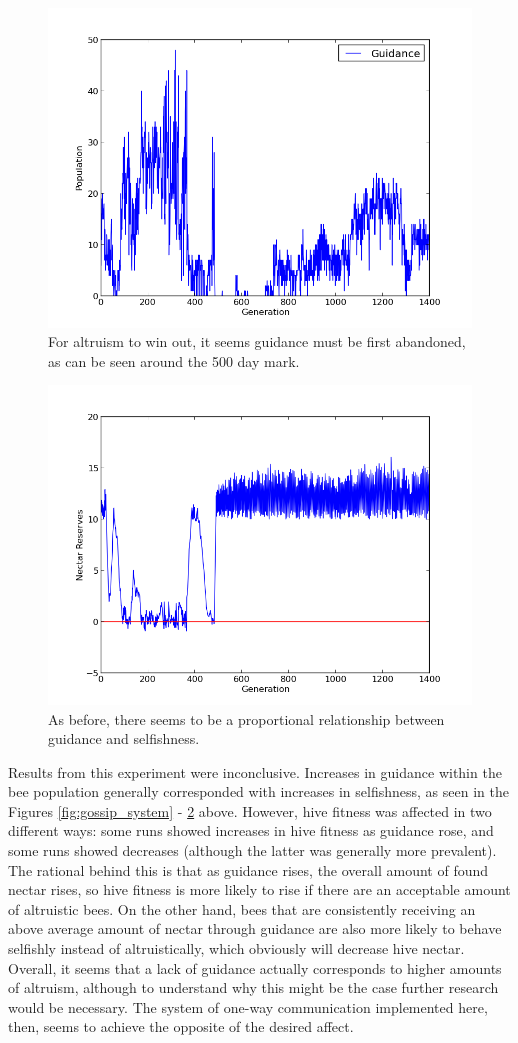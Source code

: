 \documentclass[twoside]{article}
\begin{document}
\begin{multicols}{2}
                        \begin{figure}[H]
				\begin{center}
					\includegraphics[width=.5\textwidth]{results/gossip_alt_tell.png}
				\end{center}
                \caption{For altruism to win out, it seems guidance must be first abandoned, as can be seen around the 500 day mark.}
				\label{fig:altruistic_guidance}
			\end{figure}

			\begin{figure}[H]
				\begin{center}
					\includegraphics[width=.5\textwidth]{results/gossip_alt_res.png}
				\end{center}
                \caption{As before, there seems to be a proportional relationship between guidance and selfishness.}
				\label{fig:altruistic_reserves}
			\end{figure}


            Results from this experiment were inconclusive. Increases in guidance within the bee population generally corresponded with increases in selfishness, as seen in the Figures \ref{fig:gossip_system} - \ref{fig:altruistic_reserves} above.  However, hive fitness was affected in two different ways: some runs showed increases in hive fitness as guidance rose, and some runs showed decreases (although the latter was generally more prevalent). The rational behind this is that as guidance rises, the overall amount of found nectar rises, so hive fitness is more likely to rise if there are an acceptable amount of altruistic bees. On the other hand, bees that are consistently receiving an above average amount of nectar through guidance are also more likely to behave selfishly instead of altruistically, which obviously will decrease hive nectar. Overall, it seems that a lack of guidance actually corresponds to higher amounts of altruism, although to understand why this might be the case further research would be necessary. The system of one-way communication implemented here, then, seems to achieve the opposite of the desired affect. 
            

\end{multicols}
\end{document}
